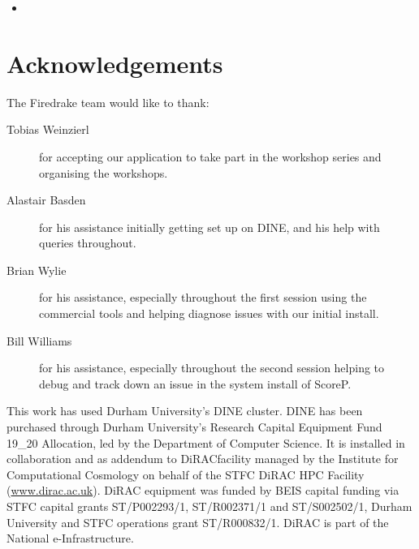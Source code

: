 \documentclass[a4paper,11pt]{article}
\begin{document}
\begin{itemize}
	\item 
\end{itemize}

\clearpage
\section*{Acknowledgements}
The Firedrake team would like to thank:
\begin{description}
	\item[Tobias Weinzierl] for accepting our application to take part in the workshop series and organising the workshops.
	\item[Alastair Basden] for his assistance initially getting set up on DINE, and his help with queries throughout.
	\item[Brian Wylie] for his assistance, especially throughout the first session using the commercial tools and helping diagnose issues with our initial install.
	\item[Bill Williams] for his assistance, especially throughout the second session helping to debug and track down an issue in the system install of ScoreP.
\end{description}

This work has used Durham University's DINE cluster. DINE has been purchased through Durham University’s Research Capital Equipment Fund 19\_20 Allocation, led by the Department of Computer Science. It is installed in collaboration and as addendum to DiRAC\@Durham facility managed by the Institute for Computational Cosmology on behalf of the STFC DiRAC HPC Facility (\url{www.dirac.ac.uk}). DiRAC equipment was funded by BEIS capital funding via STFC capital grants ST/P002293/1, ST/R002371/1 and ST/S002502/1, Durham University and STFC operations grant ST/R000832/1. DiRAC is part of the National e-Infrastructure.
\end{document}
